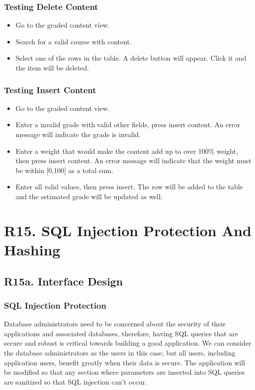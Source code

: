 \documentclass[12pt, a4paper]{article}
\begin{document}
\subsubsection*{Testing Delete Content}
\begin{itemize}
    \item Go to the graded content view.
    \item Search for a valid course with content.
    \item Select one of the rows in the table. A delete button will appear. Click it and the item will be deleted.
\end{itemize}
\subsubsection*{Testing Insert Content}
\begin{itemize}
    \item Go to the graded content view.
    \item Enter a invalid grade with valid other fields, press insert content. An error message will indicate the grade is invalid.
    \item Enter a weight that would make the content add up to over 100\% weight, then press insert content. An error message will indicate that the weight must be within [0,100] as a total sum.
    \item Enter all valid values, then press insert. The row will be added to the table and the estimated grade will be updated as well.
\end{itemize}
\section*{R15. SQL Injection Protection And Hashing}
\label{sec:R15}
\subsection*{R15a. Interface Design}
\subsubsection*{SQL Injection Protection}
Database administrators need to be concerned about the security of their applications and associated databases, therefore, having SQL queries that are secure and robust is critical towards building a good application. We can consider the database administrators as the users in this case, but all users, including application users, benefit greatly when their data is secure. The application will be modified so that any section where parameters are inserted into SQL queries are sanitized so that SQL injection can't occur.
\end{document}
